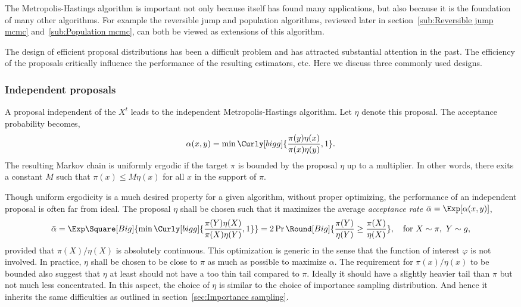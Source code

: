 The Metropolis-Hastings algorithm is important not only because itself has
found many applications, but also because it is the foundation of many other
algorithms. For example the reversible jump \mcmc and population \mcmc
algorithms, reviewed later in section~\ref{sub:Reversible jump mcmc}
and~\ref{sub:Population mcmc}, can both be viewed as extensions of this
algorithm.

The design of efficient proposal distributions has been a difficult problem
and has attracted substantial attention in the past. The efficiency of the
proposals critically influence the performance of the resulting estimators,
etc. Here we discuss three commonly used designs.

\subsubsection{Independent proposals}
\label{ssub:Independent proposals}

A proposal independent of the $X^t$ leads to the independent
Metropolis-Hastings algorithm. Let $\eta$ denote this proposal. The acceptance
probability becomes,
\begin{equation}
  \alpha(x,y) = \min\Curly[bigg]{\frac{\pi(y)\eta(x)}{\pi(x)\eta(y)},1}.
\end{equation}
The resulting Markov chain is uniformly ergodic if the target $\pi$ is bounded
by the proposal $\eta$ up to a multiplier. In other words, there exits a
constant $M$ such that $\pi(x)\le M\eta(x)$ for all $x$ in the support of
$\pi$.

Though uniform ergodicity is a much desired property for a given algorithm,
without proper optimizing, the performance of an independent proposal is often
far from ideal. The proposal $\eta$ shall be chosen such that it maximizes the
average \emph{acceptance rate} $\bar\alpha = \Exp[\alpha(x,y)]$,
\begin{equation}
  \bar\alpha
  = \Exp\Square[Big]{\min\Curly[bigg]{\frac{\pi(Y)\eta(X)}{\pi(X)\eta(Y)},1}}
  = 2\Pr\Round[Big]{\frac{\pi(Y)}{\eta(Y)}\ge\frac{\pi(X)}{\eta(X)}},\quad
  \text{for } X\sim\pi,\ Y\sim g,
\end{equation}
provided that $\pi(X)/\eta(X)$ is absolutely continuous. This optimization is
generic in the sense that the function of interest $\varphi$ is not involved.
In practice, $\eta$ shall be chosen to be close to $\pi$ as much as possible
to maximize $\alpha$. The requirement for $\pi(x)/\eta(x)$ to be bounded also
suggest that $\eta$ at least should not have a too thin tail compared to
$\pi$. Ideally it should have a slightly heavier tail than $\pi$ but not much
less concentrated. In this aspect, the choice of $\eta$ is similar to the
choice of importance sampling distribution. And hence it inherits the same
difficulties as outlined in section~\ref{sec:Importance sampling}.

